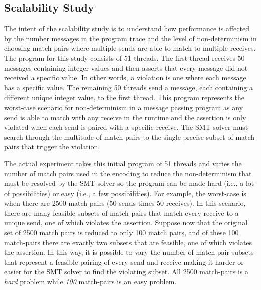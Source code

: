 \subsection{Scalability Study}

The intent of the scalability study is to understand how performance is affected by the number messages in the program trace and the level of non-determinism in choosing match-pairs where multiple sends are able to match to multiple receives. The program for this study consists of 51 threads. The first thread receives 50 messages containing integer values and then asserts that every message did not received a specific value. In other words, a violation is one where each message has a specific value.  The remaining 50 threads send a message, each containing a different unique integer value, to the first thread. This program represents the worst-case scenario for non-determinism in a message passing program as any send is able to match with any receive in the runtime and the assertion is only violated when each send is paired with a specific receive. The SMT solver must search through the multitude of match-pairs to the single precise subset of match-pairs that trigger the violation.

The actual experiment takes this initial program of 51 threads and varies the number of match pairs used in the encoding to reduce the non-determinism that must be resolved by the SMT solver so the program can be made hard (i.e., a lot of possibilities) or easy (i.e., a few possibilities). For example, the worst-case is when there are 2500 match pairs (50 sends times 50 receives). In this scenario, there are many feasible subsets of match-pairs that match every receive to a unique send, one of which violates the assertion. Suppose now that the original set of 2500 match pairs is reduced to only 100 match pairs, and of these 100 match-pairs there are exactly two subsets that are feasible, one of which violates the assertion. In this way, it is possible to vary the number of match-pair subsets that represent a feasible pairing of every send and receive making it harder or easier for the SMT solver to find the violating subset. All 2500 match-pairs is a \emph{hard} problem while \emph{100} match-pairs is an easy problem.


